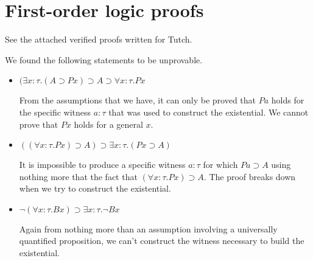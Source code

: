 \documentclass[11pt,letterpaper]{article}
\renewcommand{\implies}{\supset}
\begin{document}
\section{First-order logic proofs}

See the attached verified proofs written for Tutch.

We found the following statements to be unprovable.

\begin{itemize}
    \item
        $(\exists x : \tau . (A \implies P x)
        \implies A \implies \forall x : \tau . P x$

        From the assumptions that we have, it can only be proved that $P a$
        holds for the specific witness $a : \tau$ that was used to construct
        the existential. We cannot prove that $P x$ holds for a general $x$.

    \item
        $((\forall x : \tau . P x) \implies A)
        \implies \exists x : \tau . (P x \implies A)$

        It is impossible to produce a specific witness $a : \tau$ for which
        $P a \implies A$ using nothing more that the fact that
        $(\forall x : \tau . P x) \implies A$. The proof breaks down when we
        try to construct the existential.

    \item
        $\neg (\forall x : \tau . B x) \implies \exists x : \tau . \neg B x$

        Again from nothing more than an assumption involving a universally
        quantified proposition, we can't construct the witness necessary to
        build the existential.
\end{itemize}
\end{document}
